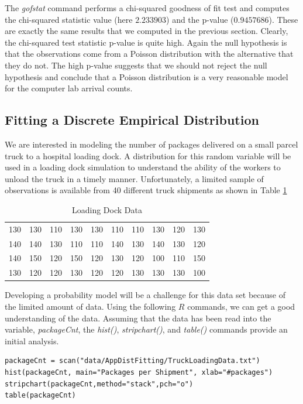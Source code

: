 \documentclass[
]{book}
\theoremstyle{definition}
\theoremstyle{definition}
\theoremstyle{definition}
\theoremstyle{definition}
\theoremstyle{remark}
\begin{document}
The \emph{gofstat} command performs a chi-squared goodness of fit test and
computes the chi-squared statistic value (here \(2.233903\)) and the
p-value (\(0.9457686\)). These are exactly the same results that we computed in the previous section. Clearly, the chi-squared test statistic p-value
is quite high. Again the null hypothesis is that the observations come
from a Poisson distribution with the alternative that they do not. The
high p-value suggests that we should not reject the null hypothesis and
conclude that a Poisson distribution is a very reasonable model for the
computer lab arrival counts.

\hypertarget{fitting-a-discrete-empirical-distribution}{%
\subsection{Fitting a Discrete Empirical Distribution}\label{fitting-a-discrete-empirical-distribution}}

We are interested in modeling the number of packages delivered on a small parcel truck to a hospital
loading dock. A distribution for this random variable will be used in a
loading dock simulation to understand the ability of the workers to
unload the truck in a timely manner. Unfortunately, a limited sample of
observations is available from 40 different truck shipments as shown in Table \ref{tab:TruckData}

\hypertarget{tab:TruckData}{}
\begin{longtable}[]{@{}cccccccccc@{}}
\caption{\label{tab:TruckData} Loading Dock Data}\tabularnewline
\toprule
\endhead
130 & 130 & 110 & 130 & 130 & 110 & 110 & 130 & 120 & 130 \\
140 & 140 & 130 & 110 & 110 & 140 & 130 & 140 & 130 & 120 \\
140 & 150 & 120 & 150 & 120 & 130 & 120 & 100 & 110 & 150 \\
130 & 120 & 120 & 130 & 120 & 120 & 130 & 130 & 130 & 100 \\
\bottomrule
\end{longtable}

Developing a probability model will be a challenge for this data set
because of the limited amount of data. Using the following \(R\) commands,
we can get a good understanding of the data. Assuming that the data has
been read into the variable, \emph{packageCnt}, the \emph{hist()}, \emph{stripchart()},
and \emph{table()} commands provide an initial analysis.

\begin{verbatim}
packageCnt = scan("data/AppDistFitting/TruckLoadingData.txt")
hist(packageCnt, main="Packages per Shipment", xlab="#packages")
stripchart(packageCnt,method="stack",pch="o")
table(packageCnt)
\end{verbatim}
\end{document}
